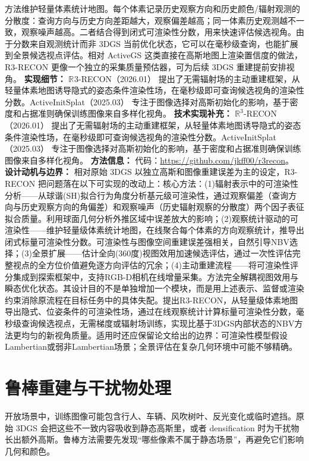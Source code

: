 方法维护轻量体素统计地图。每个体素记录历史观察方向和历史颜色/辐射观测的分散度：查询方向与历史方向差距越大，观察偏差越高；同一体素历史观测越不一致，观察噪声越高。二者结合得到闭式可渲染性分数，用来快速评估候选视角。由于分数来自观测统计而非 3DGS 当前优化状态，它可以在毫秒级查询，也能扩展到全景候选视点评估。相对 ActiveGS 这类直接在高斯地图上渲染置信度的做法，R3-RECON 更像一个独立的采集质量预估器，可为后续 3DGS 重建提前安排视角。
\textbf{实现细节：} $\mathbb{R}^{}3$-RECON（2026.01） 提出了无需辐射场的主动重建框架，从轻量体素地图诱导隐式的姿态条件渲染性场，在毫秒级即可查询候选视角的渲染性分数。ActiveInitSplat（2025.03） 专注于图像选择对高斯初始化的影响，基于密度和占据准则确保训练图像来自多样化视角。
\textbf{技术实现补充：} $\mathbb{R}^3$-RECON（2026.01） 提出了无需辐射场的主动重建框架，从轻量体素地图诱导隐式的姿态条件渲染性场，在毫秒级即可查询候选视角的渲染性分数。ActiveInitSplat（2025.03） 专注于图像选择对高斯初始化的影响，基于密度和占据准则确保训练图像来自多样化视角。
\textbf{方法信息：} 代码：\url{https://github.com/jkff00/r3recon}。
\textbf{设计动机与边界：} 相对原始 3DGS 以独立高斯和图像重建误差为主的设定，R3-RECON 把问题落在以下可实现的改动上：核心方法：(1)辐射表示中的可渲染性分析——从球谐(SH)拟合行为角度分析基元级可渲染性，通过观察偏差（查询方向与历史观察方向的角偏差）和观察噪声（历史辐射观察的分散度）两个因子表征拟合质量。利用球面几何分析外推区域中误差放大的影响；(2)观察统计驱动的可渲染性——维护轻量级体素统计地图，在线聚合每个体素的方向观察统计，推导出闭式标量可渲染性分数。可渲染性与图像空间重建误差强相关，自然引导NBV选择；(3)全景扩展——估计全向(360度)视图效用加速候选评估，通过一次性评估完整视点的全方位价值避免逐方向评估的冗余；(4)主动重建流程——将可渲染性评分集成到探索框架中，支持RGB-D相机在线增量采集。方法完全解耦视图效用与瞬态优化状态。其设计目的不是单独增加一个模块，而是用上述表示、监督或渲染约束消除原流程在目标任务中的具体失配。提出R3-RECON，从轻量级体素地图导出隐式、位姿条件的可渲染性场，通过在线观察统计计算标量可渲染性分数，毫秒级查询候选视点，无需梯度或辐射场训练，实现比基于3DGS内部状态的NBV方法更均匀的新视角质量。适用时还应保留论文给出的边界：可渲染性模型假设Lambertian或弱非Lambertian场景；全景评估在复杂几何环境中可能不够精确。

\section{鲁棒重建与干扰物处理}

开放场景中，训练图像可能包含行人、车辆、风吹树叶、反光变化或临时遮挡。原始 3DGS 会把这些不一致内容吸收到静态高斯里，或者 densification 时为干扰物长出额外高斯。鲁棒方法需要先发现“哪些像素不属于静态场景”，再避免它们影响几何和颜色。
